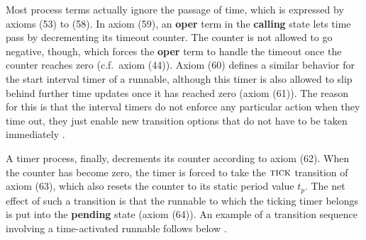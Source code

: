 \documentclass[10pt,conference]{IEEEtran}
\begin{document}
Most process terms actually ignore the passage of time, which is expressed by axioms (53) to (58). In axiom (59), an \textbf{oper} term in the \textbf{calling} state lets time pass by decrementing its timeout counter. The counter is not allowed to go negative, though, which forces the \textbf{oper} term to handle the timeout once the counter reaches zero (c.f.\ axiom (44)). Axiom (60) defines a similar behavior for the start interval timer of a runnable, although this timer is also allowed to slip behind further time updates once it has reached zero (axiom (61)). The reason for this is that the interval timers do not enforce any particular action when they time out, they just enable new transition options that do not have to be taken immediately \cite[ch.~4.2.3]{AR:RTE}.

A timer process, finally, decrements its counter according to axiom (62). When the counter has become zero, the timer is forced to take the $\textsc{tick}$ transition of axiom (63), which also resets the counter to its static period value $t_p$. The net effect of such a transition is that the runnable to which the ticking timer belongs is put into the \textbf{pending} state (axiom (64)). An example of a transition sequence involving a time-activated runnable follows below \cite[ch.~4.2.2.8]{AR:RTE}.
\end{document}
